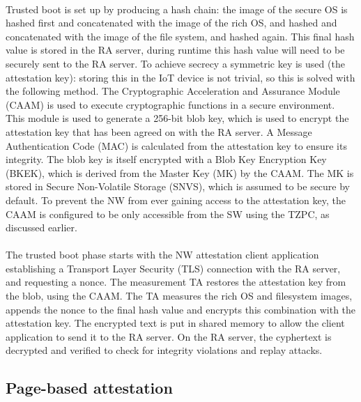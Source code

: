 \paragraph*{}
Trusted boot is set up by producing a hash chain: the image of the secure OS is hashed first and concatenated with the image of the rich OS, and hashed and concatenated with the image of the file system, and hashed again. This final hash value is stored in the RA server, during runtime this hash value will need to be securely sent to the RA server. To achieve secrecy a symmetric key is used (the attestation key): storing this in the IoT device is not trivial, so this is solved with the following method. The Cryptographic Acceleration and Assurance Module (CAAM) is used to execute cryptographic functions in a secure environment. This module is used to generate a 256-bit blob key, which is used to encrypt the attestation key that has been agreed on with the RA server. A Message Authentication Code (MAC) is calculated from the attestation key to ensure its integrity. The blob key is itself encrypted with a Blob Key Encryption Key (BKEK), which is derived from the Master Key (MK) by the CAAM. The MK is stored in Secure Non-Volatile Storage (SNVS), which is assumed to be secure by default. To prevent the NW from ever gaining access to the attestation key, the CAAM is configured to be only accessible from the SW using the TZPC, as discussed earlier.

\paragraph*{}
The trusted boot phase starts with the NW attestation client application establishing a Transport Layer Security (TLS) connection with the RA server, and requesting a nonce. The measurement TA restores the attestation key from the blob, using the CAAM. The TA measures the rich OS and filesystem images, appends the nonce to the final hash value and encrypts this combination with the attestation key. The encrypted text is put in shared memory to allow the client application to send it to the RA server. On the RA server, the cyphertext is decrypted and verified to check for integrity violations and replay attacks.

\subsection*{Page-based attestation}


